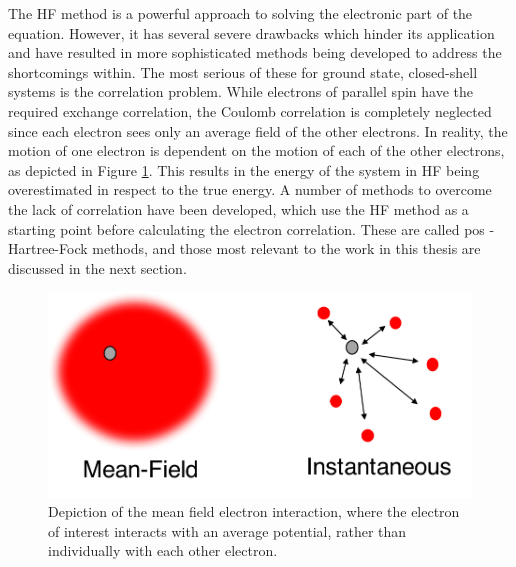 The \ac{HF} method is a powerful approach to solving the electronic part of the \schro{} equation. However, it has several severe drawbacks which hinder its application and have resulted in more sophisticated methods being developed to address the shortcomings within. The most serious of these for ground state, closed-shell systems is the correlation problem. While electrons of parallel spin have the required exchange correlation, the Coulomb correlation is completely neglected since each electron sees only an average field of the other electrons. In reality, the motion of one electron is dependent on the motion of each of the other electrons, as depicted in Figure \ref{figure: mean-field}. This results in the energy of the system in \ac{HF} being overestimated in respect to the true energy. A number of methods to overcome the lack of correlation have been developed, which use the \ac{HF} method as a starting point before calculating the electron correlation. These are called pos -Hartree-Fock methods, and those most relevant to the work in this thesis are discussed in the next section.
\begin{figure}[t]
\centering
  \includegraphics[width=0.4\linewidth]{2Theory/Mean_Field.pdf}
  \caption[Schematic of the mean-field approximation]{Depiction of the mean field electron interaction, where the electron of interest interacts with an average potential, rather than individually with each other electron.}
  \label{figure: mean-field}
\end{figure}

